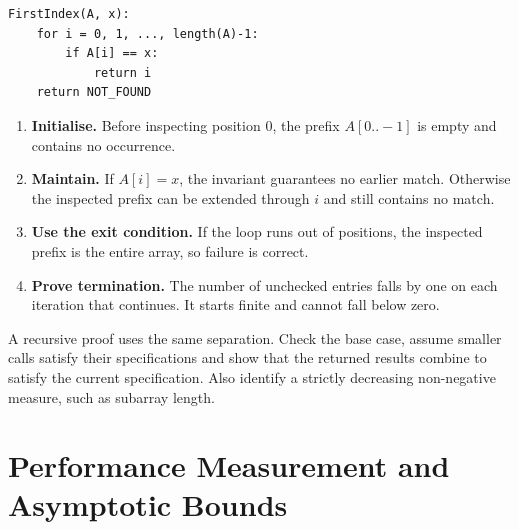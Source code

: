\documentclass[12pt,a4paper]{article}
\begin{document}
\begin{tcolorbox}[formulabox, title={Linear search for the first occurrence}]
\begin{verbatim}
FirstIndex(A, x):
    for i = 0, 1, ..., length(A)-1:
        if A[i] == x:
            return i
    return NOT_FOUND
\end{verbatim}
\end{tcolorbox}

\begin{tcolorbox}[examplebox, title={Proving linear search correct}]
\begin{enumerate}[leftmargin=*, itemsep=3pt, topsep=4pt]
  \item \textbf{Initialise.} Before inspecting position $0$, the prefix $A[0..-1]$ is empty and contains no occurrence.
  \item \textbf{Maintain.} If $A[i]=x$, the invariant guarantees no earlier match. Otherwise the inspected prefix can be extended through $i$ and still contains no match.
  \item \textbf{Use the exit condition.} If the loop runs out of positions, the inspected prefix is the entire array, so failure is correct.
  \item \textbf{Prove termination.} The number of unchecked entries falls by one on each iteration that continues. It starts finite and cannot fall below zero.
\end{enumerate}
\end{tcolorbox}

A recursive proof uses the same separation. Check the base case, assume smaller calls satisfy their specifications and show that the returned results combine to satisfy the current specification. Also identify a strictly decreasing non-negative measure, such as subarray length.

\section{Performance Measurement and Asymptotic Bounds}
\end{document}
